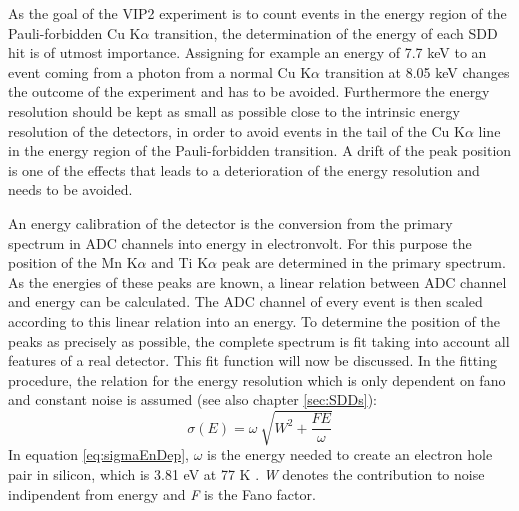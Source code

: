 As the goal of the VIP2 experiment is to count events in the energy region of the Pauli-forbidden Cu K$\alpha$ transition, the determination of the energy of each SDD hit is of utmost importance. Assigning for example an energy of 7.7 keV to an event coming from a photon from a normal Cu K$\alpha$ transition at 8.05 keV changes the outcome of the experiment and has to be avoided. Furthermore the energy resolution should be kept as small as possible close to the intrinsic energy resolution of the detectors, in order to avoid events in the tail of the Cu K$\alpha$ line in the energy region of the Pauli-forbidden transition. A drift of the peak position is one of the effects that leads to a deterioration of the energy resolution and needs to be avoided. 

An energy calibration of the detector is the conversion from the primary spectrum in ADC channels into energy in electronvolt. For this purpose the position of the Mn K$\alpha$ and Ti K$\alpha$ peak are determined in the primary spectrum. As the energies of these peaks are known, a linear relation between ADC channel and energy can be calculated. The ADC channel of every event is then scaled according to this linear relation into an energy. To determine the position of the peaks as precisely as possible, the complete spectrum is fit taking into account all features of a real detector. This fit function will now be discussed. In the fitting procedure, the relation for the energy resolution which is only dependent on fano and constant noise is assumed (see also chapter \ref{sec:SDDs}):
\begin{equation}
 \sigma(E) = \omega \ \sqrt{W^{2} + \frac{FE}{\omega}}
 \label{eq:sigmaEnDep}
\end{equation} 
In equation \ref{eq:sigmaEnDep}, $\omega$ is the energy needed to create an electron hole pair in silicon, which is 3.81 eV at 77 K \cite{Leo1993}. \textit{W} denotes the contribution to noise indipendent from energy and \textit{F} is the Fano factor. 

